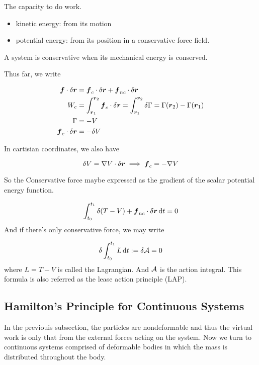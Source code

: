 \documentclass{article}
\begin{document}
\begin{definition}
    The capacity to do work.
    \begin{itemize}
        \item kinetic energy: from its motion
        \item potential energy: from its position in a conservative force field.
    \end{itemize}
    A system is conservative when its mechanical energy is conserved.
\end{definition}

Thus far, we write 

\begin{align*}
    \boldsymbol{f}\cdot\delta\boldsymbol{r}&=\boldsymbol{f}_c\cdot\delta \boldsymbol{r}+\boldsymbol{f}_{nc}\cdot\delta \boldsymbol{r}\\
    W_c &= \int_{\boldsymbol{r}_1}^{\boldsymbol{r}_2} \boldsymbol{f}_c\cdot \delta \boldsymbol{r} = \int_{\boldsymbol{r}_1}^{\boldsymbol{r}_2}\delta\Gamma = \Gamma(\boldsymbol{r}_2)-\Gamma(\boldsymbol{r}_1)\\
    \Gamma&=-V\\
    \boldsymbol{f}_c\cdot\delta\boldsymbol{r} &= -\delta V
\end{align*}

In cartisian coordinates, we also have

\[\delta V = \nabla V\cdot\delta\boldsymbol{r}\implies \boldsymbol{f}_c=-\nabla V\]

So the Conservative force maybe expressed as the gradient of the scalar potential energy function.


\begin{theorem}
    \[\int_{t_0}^{t_1} \delta (T-V)+\boldsymbol{f}_{nc}\cdot\delta \boldsymbol{r} \,\mathrm{d} t=0\]
    And if there's only conservative force, we may write

    \[\delta \int_{t_0}^{t_1} L\,\mathrm{d} t:=\delta\mathcal{A}=0\]
    where \(L=T-V\) is called the Lagrangian. And \(\mathcal{A}\) is the action integral. This formula is also referred as the lease action principle (LAP).
\end{theorem}


\subsection{Hamilton's Principle for Continuous Systems}

In the previouis subsection, the particles are nondeformable and thus the virtual work is only that from the external forces acting on the system. Now we turn to continuous systems comprised of deformable bodies in which the mass is distributed throughout the body.
\end{document}
